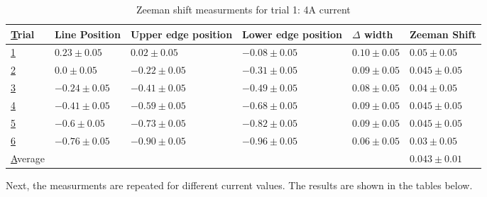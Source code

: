 \def\lineUncertainty{0.05}

\begin{table}
    \begin{adjustwidth}{-100pt}{-100pt}
        \centering
        \begin{tabular}{|l|l|l|l|l|l|}
            \hline
            {\ul Trial}   & Line Position                & Upper edge position          & Lower edge position          & $\Delta$ width              & Zeeman Shift                 \\ \hline
            {\ul 1}       & $0.23 \pm \lineUncertainty$  & $0.02 \pm \lineUncertainty$  & $-0.08 \pm \lineUncertainty$ & $0.10 \pm \lineUncertainty$ & $0.05 \pm \lineUncertainty$  \\ \hline
            {\ul 2}       & $0.0 \pm \lineUncertainty$   & $-0.22 \pm \lineUncertainty$ & $-0.31 \pm \lineUncertainty$ & $0.09 \pm \lineUncertainty$ & $0.045 \pm \lineUncertainty$ \\ \hline
            {\ul 3}       & $-0.24 \pm \lineUncertainty$ & $-0.41 \pm \lineUncertainty$ & $-0.49 \pm \lineUncertainty$ & $0.08 \pm \lineUncertainty$ & $0.04 \pm \lineUncertainty$  \\ \hline
            {\ul 4}       & $-0.41 \pm \lineUncertainty$ & $-0.59 \pm \lineUncertainty$ & $-0.68 \pm \lineUncertainty$ & $0.09 \pm \lineUncertainty$ & $0.045 \pm \lineUncertainty$ \\ \hline
            {\ul 5}       & $-0.6 \pm \lineUncertainty$  & $-0.73 \pm \lineUncertainty$ & $-0.82 \pm \lineUncertainty$ & $0.09 \pm \lineUncertainty$ & $0.045 \pm \lineUncertainty$ \\ \hline
            {\ul 6}       & $-0.76 \pm \lineUncertainty$ & $-0.90 \pm \lineUncertainty$ & $-0.96 \pm \lineUncertainty$ & $0.06 \pm \lineUncertainty$ & $0.03 \pm \lineUncertainty$  \\ \hline
            {\ul Average} &                              &                              &                              &                             & $0.043 \pm 0.01$             \\ \hline
        \end{tabular}
    \end{adjustwidth}
    \caption{Zeeman shift measurments for trial 1: 4A current}
\end{table}

Next, the measurments are repeated for different current values. The results are shown in the tables below.

